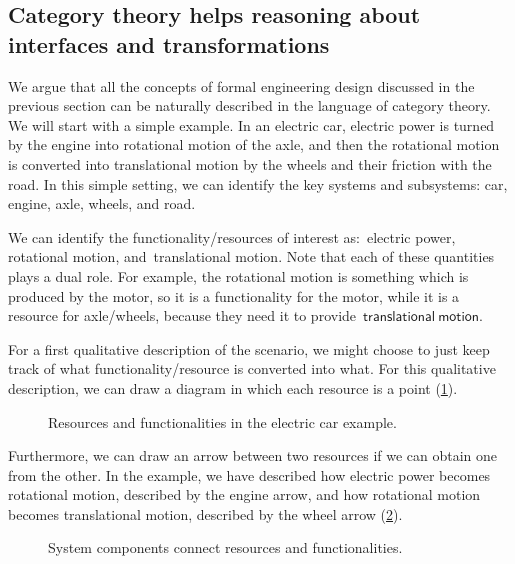\subsection{Category theory helps reasoning about interfaces and transformations}

We argue that all the concepts of formal engineering design discussed in the
previous section can be naturally described in the language of category theory. We will start with a simple example. In an electric car, electric power is turned by the engine into rotational
motion of the axle, and then the rotational motion is converted into translational motion by the wheels and their friction with the road. In this simple setting, we can identify the key systems and subsystems: car, engine, axle, wheels, and road.

We can identify the functionality/resources of interest as:~\textsf{electric} \textsf{power}, \textsf{rotational} \textsf{motion}, and~\textsf{translational} \textsf{motion}. Note that each of these quantities plays a dual role. For example, the \textsf{rotational motion} is something which is produced by the motor, so it is a functionality for the motor, while it is a resource for axle/wheels, because they need it to provide~$\mathsf{translational}\ \mathsf{motion}$.

For a first qualitative description of the scenario, we might choose to just keep track of what functionality/resource is converted into what. For this qualitative description, we can draw a diagram in which each resource is a point (\cref{fig:e1}).

\begin{figure}[h!]
    \centering
    \caption{Resources and functionalities in the electric car example. \label{fig:e1}}
\end{figure}

Furthermore, we can draw an arrow between two resources if we can obtain one from the other. In the example, we have described how \textsf{electric power} becomes \textsf{rotational motion}, described by the \textsf{engine} arrow, and how \textsf{rotational motion} becomes \textsf{translational motion}, described by the \textsf{wheel} arrow (\cref{fig:e2}).

\begin{figure}[h!]
    \centering
    \caption{System components connect resources and functionalities. \label{fig:e2}}
\end{figure}

